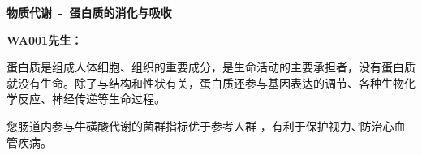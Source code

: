 

\usepackage{graphicx}
\graphicspath{{cores/}}



\setlength{\arrayrulewidth}{0.5pt}
\fontsize{9.3pt}{17pt}\selectfont
\color{gray2}

\vspace*{0mm}
\begin{center}
{\bf\sanhao 物质代谢~-~蛋白质的消化与吸收}
\end{center}


\medskip
\noindent
{\bf\xiaosihao WA001先生：}

\bigskip

蛋白质是组成人体细胞、组织的重要成分，是生命活动的主要承担者，没有蛋白质就没有生命。除了与结构和性状有关，蛋白质还参与基因表达的调节、各种生物化学反应、神经传递等生命过程。

您肠道内参与牛磺酸代谢的菌群指标优于参考人群
，有利于保护视力、’防治心血管疾病。

